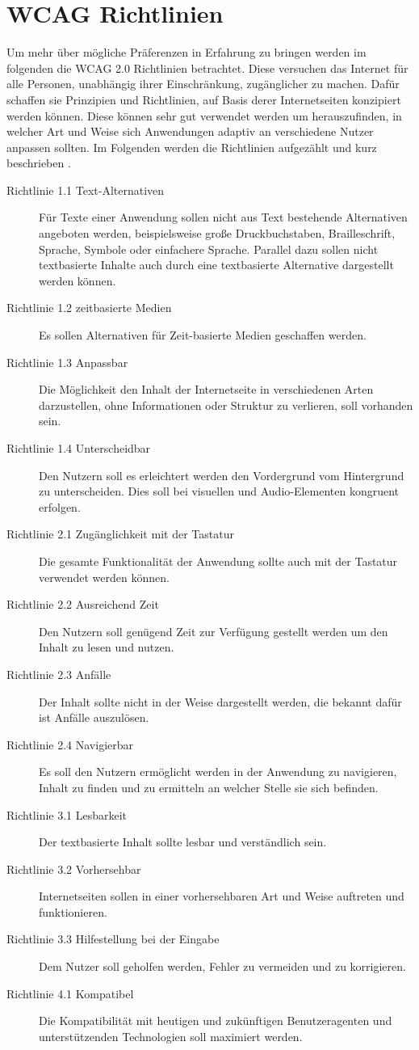 \documentclass[12pt, paper=a4, bibtotoc, toc=listof, headsepline=true, numbers=endperiod]{scrreprt}
\begin{document}
\section{WCAG Richtlinien}
Um mehr über mögliche Präferenzen in Erfahrung zu bringen werden im folgenden die \ac{WCAG 2.0} Richtlinien betrachtet. Diese versuchen das Internet für alle Personen, unabhängig ihrer Einschränkung, zugänglicher zu machen. Dafür schaffen sie Prinzipien und Richtlinien, auf Basis derer Internetseiten konzipiert werden können. Diese können sehr gut verwendet werden um herauszufinden, in welcher Art und Weise sich Anwendungen adaptiv an verschiedene Nutzer anpassen sollten. Im Folgenden werden die Richtlinien aufgezählt und kurz beschrieben \cite{wcag}.
\begin{description}
	\item [Richtlinie 1.1 Text-Alternativen] Für Texte einer Anwendung sollen nicht aus Text bestehende Alternativen angeboten werden, beispielsweise große Druckbuchstaben, Brailleschrift, Sprache, Symbole oder einfachere Sprache. Parallel dazu sollen nicht textbasierte Inhalte auch durch eine textbasierte Alternative dargestellt werden können.
	\item[Richtlinie 1.2 zeitbasierte Medien] Es sollen Alternativen für Zeit-basierte Medien geschaffen werden.
	\item[Richtlinie 1.3 Anpassbar] Die Möglichkeit den Inhalt der Internetseite in verschiedenen Arten darzustellen, ohne Informationen oder Struktur zu verlieren, soll vorhanden sein.
	\item[Richtlinie 1.4 Unterscheidbar] Den Nutzern soll es erleichtert werden den Vordergrund vom Hintergrund zu unterscheiden. Dies soll bei visuellen und Audio-Elementen kongruent erfolgen. 
	\item[Richtlinie 2.1 Zugänglichkeit mit der Tastatur] Die gesamte Funktionalität der Anwendung sollte auch mit der Tastatur verwendet werden können.	
	\item[Richtlinie 2.2 Ausreichend Zeit] Den Nutzern soll genügend Zeit zur Verfügung gestellt werden um den Inhalt zu lesen und nutzen.
	\item[Richtlinie 2.3 Anfälle] Der Inhalt sollte nicht in der Weise dargestellt werden, die bekannt dafür ist Anfälle auszulösen.
	\item[Richtlinie 2.4 Navigierbar] Es soll den Nutzern ermöglicht werden in der Anwendung zu navigieren, Inhalt zu finden und zu ermitteln an welcher Stelle sie sich befinden.
	\item[Richtlinie 3.1 Lesbarkeit] Der textbasierte Inhalt sollte lesbar und verständlich sein.	
	\item[Richtlinie 3.2 Vorhersehbar] Internetseiten sollen in einer vorhersehbaren Art und Weise auftreten und funktionieren.
	\item[Richtlinie 3.3 Hilfestellung bei der Eingabe] Dem Nutzer soll geholfen werden, Fehler zu vermeiden und zu korrigieren.
	\item[Richtlinie 4.1 Kompatibel] Die Kompatibilität mit heutigen und zukünftigen Benutzeragenten und unterstützenden Technologien soll maximiert werden.
\end{description}
\end{document}
